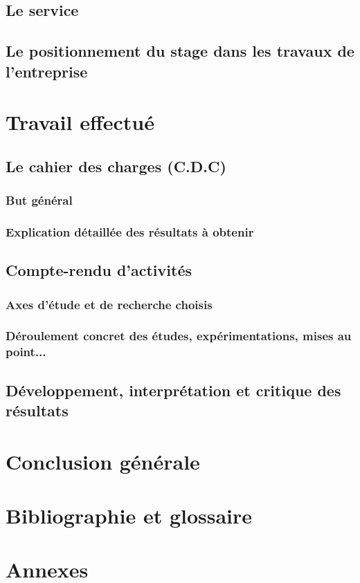 \documentclass[12pt,a4paper]{report}
\begin{document}
\section{Le service}
\section{Le positionnement du stage dans les travaux de l'entreprise}

\chapter{Travail effectué}
\section{Le cahier des charges (C.D.C)}
\subsection{But général}
\subsection{Explication détaillée des résultats à obtenir}

\section{Compte-rendu d'activités}
\subsection{Axes d'étude et de recherche choisis}
\subsection{Déroulement concret des études, expérimentations, mises au point...}

\section{Développement, interprétation et critique des résultats}

\chapter{Conclusion générale}

\chapter{Bibliographie et glossaire}
\begin{thebibliography}{99}
\end{thebibliography}

\chapter{Annexes}
\end{document}

